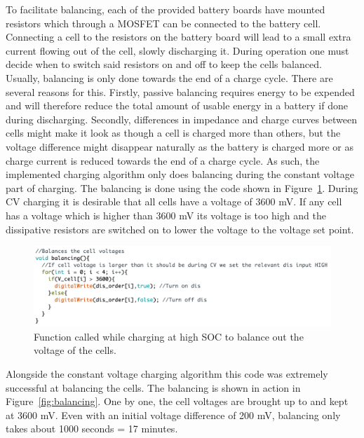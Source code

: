 \documentclass[a4paper]{article}
\begin{document}
To facilitate balancing, each of the provided battery boards have mounted 
resistors which through a MOSFET can be connected to the battery cell. 
Connecting a cell to the resistors on the battery board will lead to a 
small extra current flowing out of the cell, slowly discharging it. 
During operation one must decide when to switch said resistors on and 
off to keep the cells balanced. Usually, balancing is only done towards 
the end of a charge cycle\cite{texas}. There are several reasons for this. Firstly, 
passive balancing requires energy to be expended and will therefore reduce 
the total amount of usable energy in a battery if done during discharging. 
Secondly, differences in impedance and charge curves between cells might 
make it look as though a cell is charged more than others, but the voltage 
difference might disappear naturally as the battery is charged more or as 
charge current is reduced towards the end of a charge cycle. As such, the 
implemented charging algorithm only does balancing during the constant 
voltage part of charging. The balancing is done using the code shown in 
Figure~\ref{fig:balancingCode}. During CV charging it is desirable that all cells have a voltage 
of 3600 mV. If any cell has a voltage which is higher than 3600 mV its 
voltage is too high and the dissipative resistors are switched on to lower 
the voltage to the voltage set point. 

\begin{figure}[H]
    \centering
    \includegraphics[width = \textwidth]{Balancing_code.png}
    \caption{Function called while charging at high SOC to balance out the voltage of the cells.}
    \vspace{-10pt}
    \label{fig:balancingCode}
\end{figure}

Alongside the constant voltage charging algorithm this code was extremely 
successful at balancing the cells. The balancing is shown in action in Figure~\ref{fig:balancing}. 
One by one, the cell voltages are brought up to and kept at 3600 mV. Even with 
an initial voltage difference of 200 mV, balancing only takes about 
1000 seconds = 17 minutes. 
\end{document}
